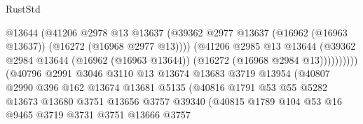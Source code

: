 \begin{lexlean}{RustStd}
\begin{coremodule}
                                          @13644
                                          (@41206
                                            @2978
                                            @13
                                            @13637
                                            (@39362
                                              @2977
                                              @13637
                                              (@16962 (@16963 @13637))
                                              (@16272 (@16968 @2977 @13))))
                                          (@41206
                                            @2985
                                            @13
                                            @13644
                                            (@39362
                                              @2984
                                              @13644
                                              (@16962 (@16963 @13644))
                                              (@16272 (@16968 @2984 @13))))))))))
                              (@40796
                                @2991
                                @3046
                                @3110
                                @13
                                @13674
                                @13683
                                @3719
                                @13954
                                (@40807
                                  @2990
                                  @396
                                  @162
                                  @13674
                                  @13681
                                  @5135
                                  (@40816
                                    @1791
                                    @53
                                    @55
                                    @5282
                                    @13673
                                    @13680
                                    @3751
                                    @13656
                                    @3757
                                    @39340
                                    (@40815
                                      @1789
                                      @104
                                      @53
                                      @16
                                      @9465
                                      @3719
                                      @3731
                                      @3751
                                      @13666
                                      @3757

\end{coremodule}
\end{lexlean}
